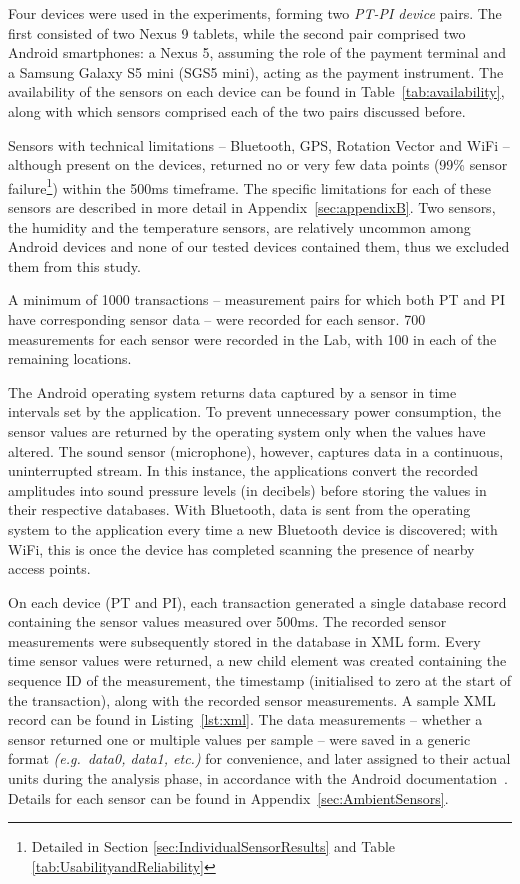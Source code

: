 \documentclass{article}
\begin{document}
Four devices were used in the experiments, forming two \textit{PT-PI device} pairs.
The first consisted of two Nexus 9 tablets, while the second pair comprised two Android smartphones: a Nexus 5, assuming the role of the payment terminal and a Samsung Galaxy S5 mini (SGS5 mini), acting as the payment instrument.  The availability of the sensors on each device can be found in Table~\ref{tab:availability}, along with which sensors comprised each of the two pairs discussed before.




Sensors with technical limitations -- Bluetooth, GPS, Rotation Vector and WiFi -- although present on the devices, returned no or very few data points (99\% sensor failure\footnote{Detailed in Section \ref{sec:IndividualSensorResults} and Table \ref{tab:UsabilityandReliability}}) within the 500ms timeframe.  The specific limitations for each of these sensors are described in more detail in Appendix~\ref{sec:appendixB}.
Two sensors, the humidity and the temperature sensors, are relatively uncommon among Android devices and none of our tested devices contained them, thus we excluded them from this study.

A minimum of 1000 transactions -- measurement pairs for which both PT and PI have corresponding sensor data -- were recorded for each sensor.  700 measurements for each sensor were recorded in the Lab, with 100 in each of the remaining locations.

The Android operating system returns data captured by a sensor in time intervals set by the application.  To prevent unnecessary power consumption, the sensor values are returned by the operating system only when the values have altered.  The sound sensor (microphone), however, captures data in a continuous, uninterrupted stream.  In this instance, the applications convert the recorded amplitudes into sound pressure levels (in decibels) before storing the values in their respective databases.
With Bluetooth, data is sent from the operating system to the application every time a new Bluetooth device is discovered; with WiFi, this is once the device has completed scanning the presence of nearby access points.

On each device (PT and PI), each transaction generated a single database record containing the sensor values measured over 500ms.
The recorded sensor measurements were subsequently stored in the database in XML form. Every time sensor values were returned, a new child element was created containing the sequence ID of the measurement, the timestamp (initialised to zero at the start of the transaction), along with the recorded sensor measurements.  A sample XML record can be found in Listing~\ref{lst:xml}.
The data measurements -- whether a sensor returned one or multiple values per sample -- were saved in a generic format \textit{(e.g.\ data0, data1, etc.)} for convenience, and later assigned to their actual units during the analysis phase, in accordance with the Android documentation~\cite{sensorUnits}.
Details for each sensor can be found in Appendix~\ref{sec:AmbientSensors}.
\end{document}
